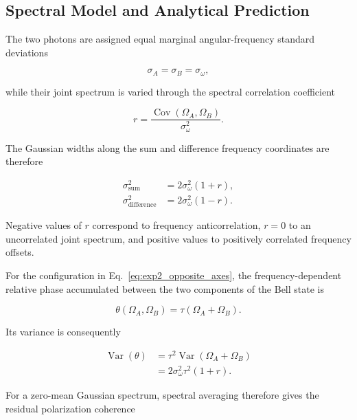 \subsection{Spectral Model and Analytical Prediction}

The two photons are assigned equal marginal angular-frequency standard deviations

\begin{equation}
\sigma_A=\sigma_B=\sigma_\omega,
\end{equation}

while their joint spectrum is varied through the spectral correlation coefficient

\begin{equation}
r
=
\frac{
\operatorname{Cov}(\Omega_A,\Omega_B)
}{
\sigma_\omega^2
}.
\label{eq:exp2_spectral_correlation_coefficient}
\end{equation}

The Gaussian widths along the sum and difference frequency coordinates are therefore

\begin{align}
\sigma_{\mathrm{sum}}^2
&=
2\sigma_\omega^2(1+r),
\\
\sigma_{\mathrm{difference}}^2
&=
2\sigma_\omega^2(1-r).
\label{eq:exp2_sum_difference_widths}
\end{align}

Negative values of \(r\) correspond to frequency anticorrelation, \(r=0\) to an
uncorrelated joint spectrum, and positive values to positively correlated frequency
offsets.

For the configuration in Eq.~\eqref{eq:exp2_opposite_axes}, the frequency-dependent
relative phase accumulated between the two components of the Bell state is

\begin{equation}
\theta(\Omega_A,\Omega_B)
=
\tau(\Omega_A+\Omega_B).
\label{eq:exp2_relative_spectral_phase}
\end{equation}

Its variance is consequently

\begin{align}
\operatorname{Var}(\theta)
&=
\tau^2
\operatorname{Var}(\Omega_A+\Omega_B)
\nonumber
\\
&=
2\sigma_\omega^2\tau^2(1+r).
\label{eq:exp2_phase_variance}
\end{align}

For a zero-mean Gaussian spectrum, spectral averaging therefore gives the residual
polarization coherence

